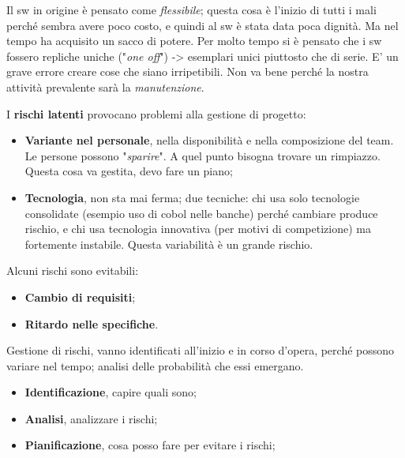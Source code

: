 Il sw in origine è pensato come \textit{flessibile}; questa cosa è l'inizio di tutti i mali perché sembra avere poco costo, e quindi al sw è stata data poca dignità. Ma nel tempo ha acquisito un sacco di potere. Per molto tempo si è pensato che i sw fossero repliche uniche ("\textit{one off}") -> esemplari unici piuttosto che di serie. E' un grave errore creare cose che siano irripetibili. Non va bene perché la nostra attività prevalente sarà la \textit{manutenzione}.

I \textbf{rischi latenti} provocano problemi alla gestione di progetto:

\begin{itemize}

	\item \textbf{Variante nel personale}, nella disponibilità e nella composizione del team. Le persone possono "\textit{sparire}". A quel punto bisogna trovare un rimpiazzo. Questa cosa va gestita, devo fare un piano;
	
	\item \textbf{Tecnologia}, non sta mai ferma; due tecniche: chi usa solo tecnologie consolidate (esempio uso di cobol nelle banche) perché cambiare produce rischio, e chi usa tecnologia innovativa (per motivi di competizione) ma fortemente instabile. Questa variabilità è un grande rischio.

\end{itemize}

Alcuni rischi sono evitabili:

\begin{itemize}

	\item \textbf{Cambio di requisiti};
	
	\item \textbf{Ritardo nelle specifiche}.

\end{itemize}

Gestione di rischi, vanno identificati all'inizio e in corso d'opera, perché possono variare nel tempo; analisi delle probabilità che essi emergano.

\begin{itemize}

	\item \textbf{Identificazione}, capire quali sono;
	
	\item \textbf{Analisi}, analizzare i rischi;
	
	\item \textbf{Pianificazione}, cosa posso fare per evitare i rischi;

\end{itemize}


